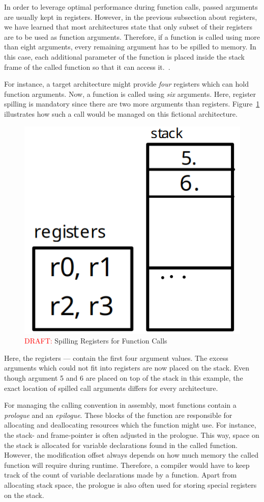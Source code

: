 In order to leverage optimal performance during function calls, passed arguments are usually kept in registers.
However, in the previous subsection about registers, we have learned that most architectures state that only subset of their registers are to be used as function arguments.
Therefore, if a function is called using more than eight arguments, every remaining argument has to be spilled to memory.
In this case, each additional parameter of the function is placed inside the stack frame of the called function so that it can access it.~\cite[p.~98]{Patterson2017-zq}.

For instance, a target architecture might provide \emph{four} registers which can hold function arguments.
Now, a function is called using \emph{six} arguments.
Here, register spilling is mandatory since there are two more arguments than registers.
Figure~\ref{fig:call_conv_spill} illustrates how such a call would be managed on this fictional architecture.

\begin{figure}
	\centering
	\includegraphics[width=.2\textwidth]{./calling_convention_draft.png}
	\caption{\textcolor{red}{DRAFT:} Spilling Registers for Function Calls}\label{fig:call_conv_spill}
\end{figure}

Here, the registers  —  contain the first four argument values.
The excess arguments which could not fit into registers are now placed on the stack.
Even though argument 5 and 6 are placed on top of the stack in this example,
the exact location of spilled call arguments differs for every architecture.

For managing the calling convention in assembly, most functions contain a \emph{prologue} and an \emph{epilogue}.
These blocks of the function are responsible for allocating and deallocating resources which the function might use.
For instance, the stack- and frame-pointer is often adjusted in the prologue.
This way, space on the stack is allocated for variable declarations found in the called function.
However, the modification offset always depends on how much memory the called function will require during runtime.
Therefore, a compiler would have to keep track of the count of variable declarations made by a function.
Apart from allocating stack space, the prologue is also often used for storing special registers on the stack.

